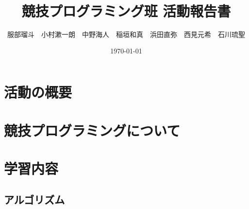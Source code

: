 \documentclass[11pt,a4paper]{jsarticle}
\title{競技プログラミング班 活動報告書}
\author{服部瑠斗　小村漱一朗　中野海人　稲垣和真　浜田直弥　西見元希　石川琉聖}
\date{\today}
\begin{document}
\maketitle
%
%
\section{活動の概要}
\section{競技プログラミングについて}
\section{学習内容}
\subsection{アルゴリズム}
\end{document}

